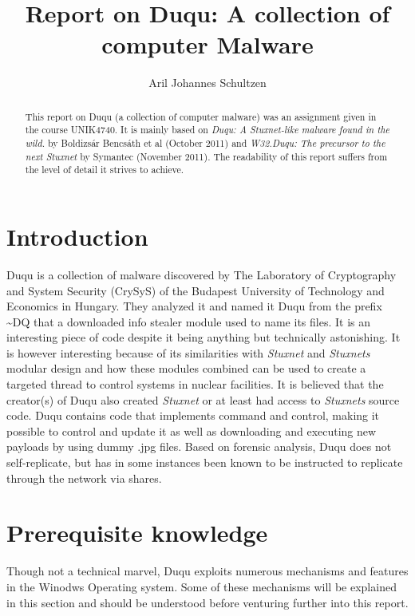 \documentclass[11pt,english,a4paper]{report}
\title{Report on Duqu: A collection of computer Malware}
\author{Aril Johannes Schultzen}
\begin{document}
\maketitle
\thispagestyle{empty}
\setcounter{page}{0}
\tableofcontents
\thispagestyle{empty}
\setcounter{page}{0}
\thispagestyle{empty}
\setcounter{page}{0}
\clearpage
\setcounter{page}{1}

\begin{abstract}
This report on Duqu (a collection of computer malware) was an assignment given in the course UNIK4740. It is mainly based on \textit{Duqu: A Stuxnet-like malware found in the wild.}\cite{DUQU_BUD} by Boldizsár Bencsáth et al (October 2011) and \textit{W32.Duqu: The precursor to the next Stuxnet}\cite{DUQU_SYMANTEC} by Symantec (November 2011). The readability of this report suffers from the level of detail it strives to achieve.
\end{abstract}
\newpage

\chapter{Introduction}
Duqu is a collection of malware discovered by The Laboratory of Cryptography and System Security (CrySyS) of the Budapest University of Technology and Economics in Hungary. They analyzed it and named it Duqu from the prefix \textasciitilde DQ that a downloaded info stealer module used to name its files. It is an interesting piece of code despite it being anything but technically astonishing. It is however interesting because of its similarities with \textit{Stuxnet} and \textit{Stuxnets} modular design and how these modules combined can be used to create a targeted thread to control systems in nuclear facilities. It is believed that the creator(s) of Duqu also created \textit{Stuxnet} or at least had access to \textit{Stuxnets} source code. Duqu contains code that implements command and control, making it possible to control and update it as well as downloading and executing new payloads by using dummy .jpg files. Based on forensic analysis, Duqu does not self-replicate, but has in some instances been known to be instructed to replicate through the network via shares. \cite{DUQU_SYMANTEC}

\chapter{Prerequisite knowledge}
Though not a technical marvel, Duqu exploits numerous mechanisms and features in the Winodws Operating system. Some of these mechanisms will be explained in this section and should be understood before venturing further into this report.
\end{document}
